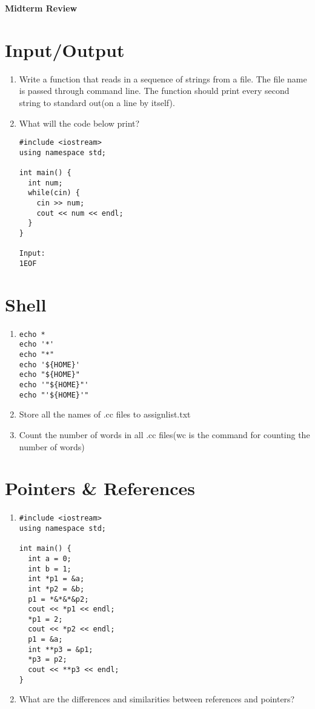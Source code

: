 \documentclass[12pt]{article}
\begin{document}
    
\begin{center}
    \textbf{\huge Midterm Review}
\end{center}

\section{Input/Output}
\begin{enumerate}
    \item Write a function that reads in a sequence of strings from a file. The file name is passed through 
    command line. The function should print every second string to standard out(on a line by itself).
    \item What will the code below print?
        \begin{verbatim}
#include <iostream>
using namespace std;
    
int main() {
  int num;
  while(cin) {
    cin >> num;
    cout << num << endl;
  }
}
    
Input:
1EOF
        \end{verbatim}
\end{enumerate}

\section{Shell}
\begin{enumerate}
    \item \begin{verbatim}
echo *
echo '*'
echo "*"
echo '${HOME}'
echo "${HOME}"
echo '"${HOME}"'
echo "'${HOME}'"
    \end{verbatim}
    \item Store all the names of .cc files to assignlist.txt
    \item Count the number of words in all .cc files(wc is the command for counting the number of words)
\end{enumerate}

\section{Pointers \& References}
\begin{enumerate}
    \item \begin{verbatim}
#include <iostream>
using namespace std;

int main() {
  int a = 0;
  int b = 1;
  int *p1 = &a;
  int *p2 = &b;
  p1 = *&*&*&p2;
  cout << *p1 << endl;
  *p1 = 2;
  cout << *p2 << endl;
  p1 = &a;
  int **p3 = &p1;
  *p3 = p2;
  cout << **p3 << endl;
}
    \end{verbatim}
    \item What are the differences and similarities between references and pointers?
\end{enumerate}
\end{document}
